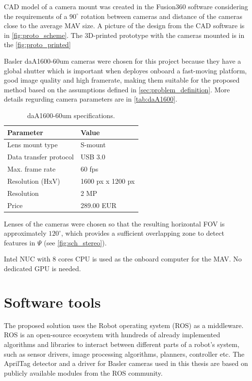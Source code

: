 CAD model of a camera mount was created in the Fusion360 software considering the requirements of a $90^\circ$ rotation between cameras and distance of the cameras close to the average MAV size.
A picture of the design from the CAD software is in \autoref{fig:proto_scheme}.
The 3D-printed prototype with the cameras mounted is in the \autoref{fig:proto_printed}

Basler daA1600-60um cameras were chosen for this project because they have a global shutter which is important when deployes onboard a fast-moving platform, good image quality and high framerate, making them suitable for the proposed method based on the assumptions defined in \autoref{sec:problem_definition}. 
More details regurding camera parameters are in \autoref{tab:daA1600}.

\begin{table}
    \caption{daA1600-60um specifications.}
    \label{tab:daA1600}
    \begin{center}
      \begin{tabular}{ l l }
      \hline
      Parameter              & Value          \\ \hline
      Lens mount type        & S-mount           \\
      Data transfer protocol & USB 3.0           \\
      Max. frame rate        & 60 fps            \\
      Resolution (HxV)       & 1600 px x 1200 px \\
      Resolution             & 2 MP              \\
      Price                  & 289.00 EUR        \\ \hline
      \end{tabular}
    \end{center}
\end{table}

Lenses of the cameras were chosen so that the resulting horizontal FOV is approximately $120^\circ$, which provides a sufficient overlapping zone to detect features in $\Psi$ (see \autoref{fig:sch_stereo}).

Intel NUC with 8 cores CPU is used as the onboard computer for the MAV. 
No dedicated GPU is needed.

\section{Software tools}
\label{sec:impl_software}

The proposed solution uses the Robot operating system (ROS) \cite{Rospaper} as a middleware.
ROS is an open-source ecosystem with hundreds of already implemented algorithms and libraries to interact between different parts of a robot's system, such as sensor drivers, image processing algorithms, planners, controller etc.
The AprilTag detector and a driver for Basler cameras used in this thesis are based on publicly available modules from the ROS community.

